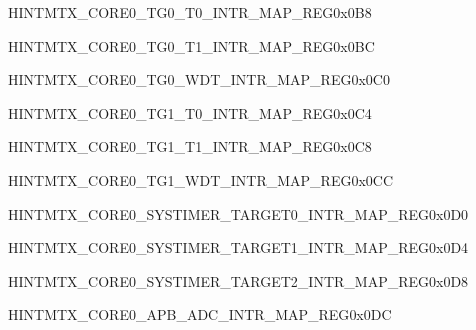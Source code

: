 \begin{register}{H}{INTMTX\_CORE0\_TG0\_T0\_INTR\_MAP\_REG}{0x0B8}\label{regdesc:INTMTXCORE0TG0T0INTRMAPREG} \end{register}\vspace{-3em}
\begin{register}{H}{INTMTX\_CORE0\_TG0\_T1\_INTR\_MAP\_REG}{0x0BC}\label{regdesc:INTMTXCORE0TG0T1INTRMAPREG} \end{register}\vspace{-3em}
\begin{register}{H}{INTMTX\_CORE0\_TG0\_WDT\_INTR\_MAP\_REG}{0x0C0}\label{regdesc:INTMTXCORE0TG0WDTINTRMAPREG} \end{register}\vspace{-3em}
\begin{register}{H}{INTMTX\_CORE0\_TG1\_T0\_INTR\_MAP\_REG}{0x0C4}\label{regdesc:INTMTXCORE0TG1T0INTRMAPREG} \end{register}\vspace{-3em}
\begin{register}{H}{INTMTX\_CORE0\_TG1\_T1\_INTR\_MAP\_REG}{0x0C8}\label{regdesc:INTMTXCORE0TG1T1INTRMAPREG} \end{register}\vspace{-3em}
\begin{register}{H}{INTMTX\_CORE0\_TG1\_WDT\_INTR\_MAP\_REG}{0x0CC}\label{regdesc:INTMTXCORE0TG1WDTINTRMAPREG} \end{register}\vspace{-3em}
\begin{register}{H}{INTMTX\_CORE0\_SYSTIMER\_TARGET0\_INTR\_MAP\_REG}{0x0D0}\label{regdesc:INTMTXCORE0SYSTIMERTARGET0INTRMAPREG} \end{register}\vspace{-3em}
\begin{register}{H}{INTMTX\_CORE0\_SYSTIMER\_TARGET1\_INTR\_MAP\_REG}{0x0D4}\label{regdesc:INTMTXCORE0SYSTIMERTARGET1INTRMAPREG} \end{register}\vspace{-3em}
\begin{register}{H}{INTMTX\_CORE0\_SYSTIMER\_TARGET2\_INTR\_MAP\_REG}{0x0D8}\label{regdesc:INTMTXCORE0SYSTIMERTARGET2INTRMAPREG} \end{register}\vspace{-3em}
\begin{register}{H}{INTMTX\_CORE0\_APB\_ADC\_INTR\_MAP\_REG}{0x0DC}\label{regdesc:INTMTXCORE0APBADCINTRMAPREG} \end{register}\vspace{-3em}
